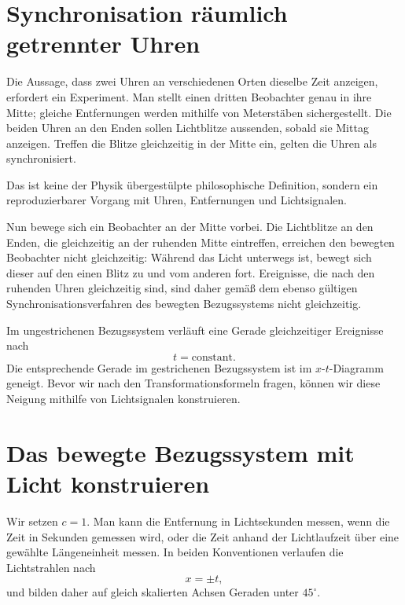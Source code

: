 \section{Synchronisation räumlich getrennter Uhren}

Die Aussage, dass zwei Uhren an verschiedenen Orten dieselbe Zeit anzeigen, erfordert ein Experiment. Man stellt einen dritten Beobachter genau in ihre Mitte; gleiche Entfernungen werden mithilfe von Meterstäben sichergestellt. Die beiden Uhren an den Enden sollen Lichtblitze aussenden, sobald sie Mittag anzeigen. Treffen die Blitze gleichzeitig in der Mitte ein, gelten die Uhren als synchronisiert.

Das ist keine der Physik übergestülpte philosophische Definition, sondern ein reproduzierbarer Vorgang mit Uhren, Entfernungen und Lichtsignalen.

Nun bewege sich ein Beobachter an der Mitte vorbei. Die Lichtblitze an den Enden, die gleichzeitig an der ruhenden Mitte eintreffen, erreichen den bewegten Beobachter nicht gleichzeitig: Während das Licht unterwegs ist, bewegt sich dieser auf den einen Blitz zu und vom anderen fort. Ereignisse, die nach den ruhenden Uhren gleichzeitig sind, sind daher gemäß dem ebenso gültigen Synchronisationsverfahren des bewegten Bezugssystems nicht gleichzeitig.

Im ungestrichenen Bezugssystem verläuft eine Gerade gleichzeitiger Ereignisse nach
\begin{equation}
t=\text{constant}.
\end{equation}
Die entsprechende Gerade im gestrichenen Bezugssystem ist im \(x\)-\(t\)-Diagramm geneigt. Bevor wir nach den Transformationsformeln fragen, können wir diese Neigung mithilfe von Lichtsignalen konstruieren.

\section{Das bewegte Bezugssystem mit Licht konstruieren}

Wir setzen \(c=1\). Man kann die Entfernung in Lichtsekunden messen, wenn die Zeit in Sekunden gemessen wird, oder die Zeit anhand der Lichtlaufzeit über eine gewählte Längeneinheit messen. In beiden Konventionen verlaufen die Lichtstrahlen nach
\begin{equation}
x=\pm t,
\label{eq:sr1-light-units}
\end{equation}
und bilden daher auf gleich skalierten Achsen Geraden unter \(45^\circ\).

